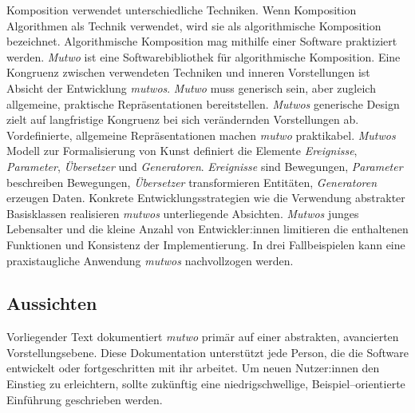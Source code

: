 \documentclass[12pt,a4paper,ngerman]{article}
\begin{document}
Komposition verwendet unterschiedliche Techniken.
Wenn Komposition Algorithmen als Technik verwendet, wird sie als algorithmische Komposition bezeichnet.
Algorithmische Komposition mag mithilfe einer Software praktiziert werden.
\emph{Mutwo} ist eine Softwarebibliothek für algorithmische Komposition.
Eine Kongruenz zwischen verwendeten Techniken und inneren Vorstellungen ist Absicht der Entwicklung \emph{mutwos}.
\emph{Mutwo} muss generisch sein, aber zugleich allgemeine, praktische Repräsentationen bereitstellen.
\emph{Mutwos} generische Design zielt auf langfristige Kongruenz bei sich verändernden Vorstellungen ab.
Vordefinierte, allgemeine Repräsentationen machen \emph{mutwo} praktikabel.
\emph{Mutwos} Modell zur Formalisierung von Kunst definiert die Elemente \emph{Ereignisse}, \emph{Parameter}, \emph{Übersetzer} und \emph{Generatoren}.
\emph{Ereignisse} sind Bewegungen, \emph{Parameter} beschreiben Bewegungen, \emph{Übersetzer} transformieren Entitäten, \emph{Generatoren} erzeugen Daten.
Konkrete Entwicklungsstrategien wie die Verwendung abstrakter Basisklassen realisieren \emph{mutwos} unterliegende Absichten.
\emph{Mutwos} junges Lebensalter und die kleine Anzahl von Entwickler:innen limitieren die enthaltenen Funktionen und Konsistenz der Implementierung.
In drei Fallbeispielen kann eine praxistaugliche Anwendung \emph{mutwos} nachvollzogen werden.

\subsection{Aussichten}
Vorliegender Text dokumentiert \emph{mutwo} primär auf einer abstrakten, avancierten Vorstellungsebene.
Diese Dokumentation unterstützt jede Person, die die Software entwickelt oder fortgeschritten mit ihr arbeitet.
Um neuen Nutzer:innen den Einstieg zu erleichtern, sollte zukünftig eine niedrigschwellige, Beispiel--orientierte Einführung geschrieben werden.


\newpage

\printbibliography

\newpage

\appendix
\end{document}
